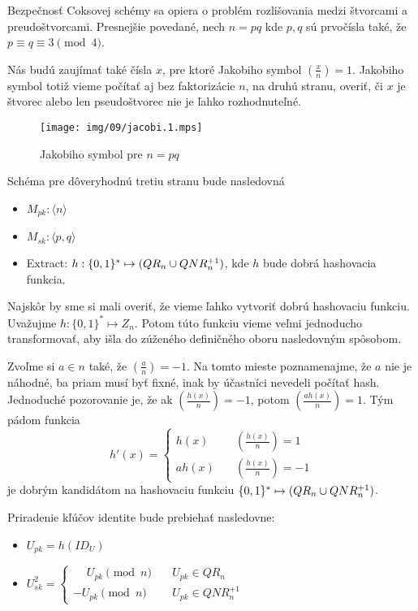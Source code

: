 Bezpečnosť Coksovej schémy \cite{cocks} sa opiera o problém rozlišovania medzi
štvorcami a preudoštvorcami. Presnejšie povedané,
nech $n=pq$ kde $p,q$ sú prvočísla také, že $p \equiv q \equiv 3 \pmod{4}$.

\def\jacobi#1#2{\left( \frac{#1}{#2} \right)}

Nás budú zaujímať také čísla $x$, pre ktoré Jakobiho symbol
$\jacobi{x}{n} =1$. Jakobiho symbol totiž vieme počítať aj bez
faktorizácie $n$, na druhú stranu, overiť, či $x$ je štvorec alebo len
pseudoštvorec nie je ľahko rozhodnuteľné.

\begin{figure}[h]
    \centering
    \texttt{[image: img/09/jacobi.1.mps]}
    \caption{Jakobiho symbol pre $n=pq$}
    \label{fig:jacobi}
\end{figure}


Schéma pre dôveryhodnú tretiu stranu bude nasledovná
\begin{itemize}
    \item $M_{pk}: \langle n \rangle$
    \item $M_{sk}: \langle p,q \rangle$
    \item Extract: $h: \{0,1\}^* \mapsto (QR_n \cup QNR_n^{+1})$,
    kde $h$ bude dobrá hashovacia funkcia.
\end{itemize}

Najskôr by sme si mali overiť, že vieme ľahko vytvoriť dobrú
hashovaciu funkciu. Uvažujme $h:\{0,1\}^* \mapsto Z_n$.
Potom túto funkciu vieme veľmi jednoducho transformovať, aby išla do
zúženého definičného oboru nasledovným spôsobom.

Zvoľme si $a \in n$ také, že $\jacobi{a}{n} = -1$. Na tomto mieste
poznamenajme, že $a$ nie je náhodné, ba priam musí byť fixné, inak by
účastníci nevedeli počítať hash.
Jednoduché pozorovanie je, že ak $\jacobi{h(x)}{n}=-1$,
potom $\jacobi{a h(x)}{n}=1$.
Tým pádom funkcia
\begin{equation*}
h'(x) = \begin{cases}
            h(x)   \quad &\jacobi{h(x)}{n}=1 \\
            a h(x) \quad &\jacobi{h(x)}{n}=-1
        \end{cases}
\end{equation*}
je dobrým kandidátom na hashovaciu funkciu
$\{0,1\}^* \mapsto (QR_n \cup QNR_n^{+1})$.

Priradenie kľúčov identite bude prebiehať nasledovne:
\begin{itemize}
    \item $U_{pk}=h(ID_U)$

    \item $U_{sk}^2=\begin{cases}
            \phantom{-} U_{pk}\pmod{n}  \quad& U_{pk} \in QR_n \\
                     -  U_{pk}\pmod{n}  \quad& U_{pk} \in QNR_n^{+1}
                    \end{cases}$
\end{itemize}

